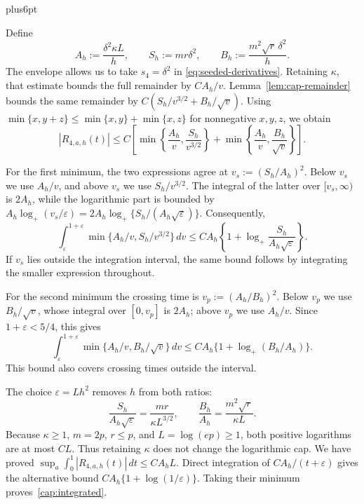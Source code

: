 \documentclass[11pt,letterpaper,twoside,leqno]{article}
\makeatletter
\theoremstyle{bookplain}
\theoremstyle{bookremark}
\renewenvironment{proof}[1][\proofname]{\par
  \pushQED{\qed}\normalfont\topsep6pt plus6pt\relax
  \trivlist\item[\hskip\labelsep\bfseries #1\@addpunct{.}]\ignorespaces
}{\popQED\endtrivlist\@endpefalse}
\makeatother
\begin{document}
\begin{proof}[Proof of Proposition~\ref{prop:dimension-cap}]
Define
\[
 A_h:=\frac{\delta^2\kappa L}h,\qquad
 S_h:=mr\delta^2,\qquad
 B_h:=\frac{m^2\sqrt r\,\delta^2}h.
\]
The envelope allows us to take $s_4=\delta^2$ in
\eqref{eq:seeded-derivatives}. Retaining $\kappa$, that estimate
bounds the full remainder by $CA_h/v$. Lemma~\ref{lem:cap-remainder} bounds the same
remainder by $C(S_h/v^{3/2}+B_h/\sqrt v)$.
Using $\min\{x,y+z\}\le\min\{x,y\}+\min\{x,z\}$ for
nonnegative $x,y,z$, we obtain
\[
 |R_{4,a,h}(t)|\le C\left[
 \min\left\{\frac{A_h}v,\frac{S_h}{v^{3/2}}\right\}
 +\min\left\{\frac{A_h}v,\frac{B_h}{\sqrt v}\right\}\right].
\]

For the first minimum, the two expressions agree at
$v_s:=(S_h/A_h)^2$. Below $v_s$ we use $A_h/v$, and above
$v_s$ we use $S_h/v^{3/2}$. The integral of the latter
over $[v_s,\infty)$ is $2A_h$, while the logarithmic part
is bounded by
$A_h\log_+(v_s/\varepsilon)
 =2A_h\log_+\{S_h/(A_h\sqrt\varepsilon)\}$.
Consequently,
\[
 \int_\varepsilon^{1+\varepsilon}
       \min\{A_h/v,S_h/v^{3/2}\}\,dv
 \le CA_h\left\{1+\log_+
                    \frac{S_h}{A_h\sqrt\varepsilon}\right\}.
\]
If $v_s$ lies outside the integration interval, the same bound
follows by integrating the smaller expression throughout.

For the second minimum the crossing time is
$v_p:=(A_h/B_h)^2$. Below $v_p$ we use $B_h/\sqrt v$,
whose integral over $[0,v_p]$ is $2A_h$; above $v_p$ we use
$A_h/v$. Since $1+\varepsilon<5/4$, this gives
\[
 \int_\varepsilon^{1+\varepsilon}
       \min\{A_h/v,B_h/\sqrt v\}\,dv
 \le CA_h\{1+\log_+(B_h/A_h)\}.
\]
This bound also covers crossing times outside the interval.

The choice $\varepsilon=Lh^2$ removes $h$ from both ratios:
\[
 \frac{S_h}{A_h\sqrt\varepsilon}=\frac{mr}{\kappa L^{3/2}},
 \qquad \frac{B_h}{A_h}=\frac{m^2\sqrt r}{\kappa L}.
\]
Because $\kappa\ge1$, $m=2p$, $r\le p$, and $L=\log(ep)\ge1$,
both positive logarithms are at most $CL$. Thus retaining $\kappa$
does not change the logarithmic cap.
We have proved
$\sup_a\int_0^1|R_{4,a,h}(t)|\,dt\le CA_hL$.
Direct integration of $CA_h/(t+\varepsilon)$ gives the
alternative bound $CA_h\{1+\log(1/\varepsilon)\}$.
Taking their minimum proves~\eqref{cap:integrated}.


\end{proof}
\end{document}
